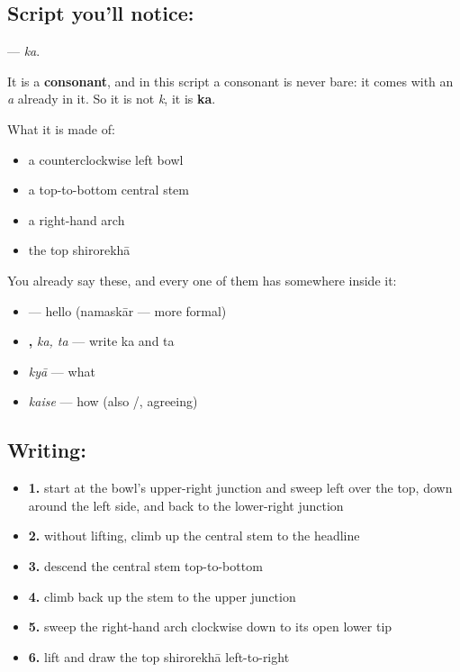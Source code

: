 \subsection*{Script you'll notice: }
\textbf{} — \emph{ka}.

It is a \textbf{consonant}, and in this script a consonant is never bare: it comes with an \emph{a} already in it. So it is not \emph{k}, it is \textbf{ka}.

What it is made of:

\begin{itemize}
\raggedright
  \item a counterclockwise left bowl
  \item a top-to-bottom central stem
  \item a right-hand arch
  \item the top shirorekhā
\end{itemize}

You already say these, and every one of them has  somewhere inside it:

\begin{itemize}
\raggedright
  \item \textbf{} — hello (namaskār — more formal)
  \item \textbf{, } \emph{ka, ta} — write ka and ta
  \item \textbf{} \emph{kyā} — what
  \item \textbf{} \emph{kaise} — how (also /, agreeing)
\end{itemize}

\subsection*{Writing: }

\begin{itemize}
\raggedright
  \item \textbf{1.} start at the bowl's upper-right junction and sweep left over the top, down around the left side, and back to the lower-right junction
  \item \textbf{2.} without lifting, climb up the central stem to the headline
  \item \textbf{3.} descend the central stem top-to-bottom
  \item \textbf{4.} climb back up the stem to the upper junction
  \item \textbf{5.} sweep the right-hand arch clockwise down to its open lower tip
  \item \textbf{6.} lift and draw the top shirorekhā left-to-right
\end{itemize}

